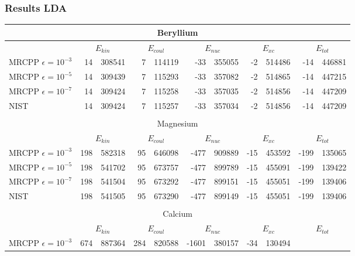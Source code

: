 \documentclass[slides]{beamer}
\begin{document}
\begin{frame}
	\frametitle{Results LDA}
	\begin{table}
		\tiny
		\centering
		\begin{tabular}{|l|r@{.}l|r@{.}l|r@{.}l|r@{.}l|r@{.}l|}
			\multicolumn{11}{c}{Beryllium}\\
			\hline
			&
			\multicolumn{2}{c|}{$E_{kin}$}&
			\multicolumn{2}{c|}{$E_{coul}$}&
			\multicolumn{2}{c|}{$E_{nuc}$}&
			\multicolumn{2}{c|}{$E_{xc}$}&
			\multicolumn{2}{c|}{$E_{tot}$}\\
			\hline
			MRCPP $\epsilon = 10^{-3}$&
			 14&308541&
			  7&114119&
			-33&355055&
			 -2&514486&
			-14&446881\\
			MRCPP $\epsilon = 10^{-5}$&
			 14&309439&
			  7&115293&
			-33&357082&
			 -2&514865&
			-14&447215\\
			MRCPP $\epsilon=10^{-7}$&
			 14&309424&
			  7&115258&
			-33&357035&
			 -2&514856&
			-14&447209\\
			\hline
			NIST&
			14&309424&
			7&115257&
			-33&357034&
			-2&514856&
			-14&447209\\
			\hline
			\multicolumn{11}{c}{}\\
			\multicolumn{11}{c}{Magnesium}\\
			\hline
			&
			\multicolumn{2}{c|}{$E_{kin}$}&
			\multicolumn{2}{c|}{$E_{coul}$}&
			\multicolumn{2}{c|}{$E_{nuc}$}&
			\multicolumn{2}{c|}{$E_{xc}$}&
			\multicolumn{2}{c|}{$E_{tot}$}\\
			\hline
			MRCPP $\epsilon=10^{-3}$&
			 198&582318&
			  95&646098&
			-477&909889&
			 -15&453592&
			-199&135065\\
			MRCPP $\epsilon=10^{-5}$&
			 198&541702&
			  95&673757&
			-477&899789&
			 -15&455091&
			-199&139422\\
			MRCPP $\epsilon=10^{-7}$&
			 198&541504&
			  95&673292&
			-477&899151&
			 -15&455051&
			-199&139406\\
			\hline
			NIST&
			 198&541505&
			  95&673290&
			-477&899149&
			 -15&455051&
			-199&139406\\
			\hline
			\multicolumn{11}{c}{}\\
			\multicolumn{11}{c}{Calcium}\\
			\hline
			&
			\multicolumn{2}{c|}{$E_{kin}$}&
			\multicolumn{2}{c|}{$E_{coul}$}&
			\multicolumn{2}{c|}{$E_{nuc}$}&
			\multicolumn{2}{c|}{$E_{xc}$}&
			\multicolumn{2}{c|}{$E_{tot}$}\\
			\hline
			MRCPP $\epsilon=10^{-3}$&
			  674&887364&
			  284&820588&
			-1601&380157&
			  -34&130494&

\end{tabular}
\end{table}
\end{frame}
\end{document}
